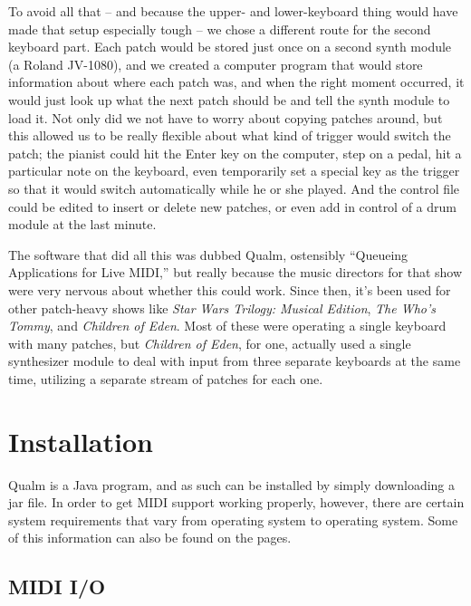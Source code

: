 \documentclass{article}
\newcommand{\q}{{\textsf{Qualm}}\xspace}
\begin{document}
To avoid all that -- and because the upper- and lower-keyboard thing
would have made that setup especially tough -- we chose a different
route for the second keyboard part.  Each patch would be stored just
once on a second synth module (a Roland JV-1080), and we created a
computer program that would store information about where each patch
was, and when the right moment occurred, it would just look up what
the next patch should be and tell the synth module to load it.  Not
only did we not have to worry about copying patches around, but this
allowed us to be really flexible about what kind of trigger would
switch the patch; the pianist could hit the Enter key on the computer,
step on a pedal, hit a particular note on the keyboard, even
temporarily set a special key as the trigger so that it would switch
automatically while he or she played.  And the control file could be
edited to insert or delete new patches, or even add in control of a
drum module at the last minute.

The software that did all this was dubbed \q, ostensibly ``Queueing
Applications for Live MIDI,'' but really because the music directors
for that show were very nervous about whether this could work.  Since
then, it's been used for other patch-heavy shows like {\em Star Wars
Trilogy: Musical Edition}, {\em The Who's Tommy}, and {\em Children of
Eden}.  Most of these were operating a single keyboard with many
patches, but {\em Children of Eden}, for one, actually used a single
synthesizer module to deal with input from three separate keyboards at
the same time, utilizing a separate stream of patches for each one.

\begin{latexonly}
\newpage
\end{latexonly}
\section{Installation}

\q is a Java program, and as such can be installed by simply
downloading a jar file.  In order to get MIDI support working
properly, however, there are certain system requirements that vary
from operating system to operating system.  Some of this information
can also be found on the  pages.

\subsection{MIDI I/O}
\end{document}
